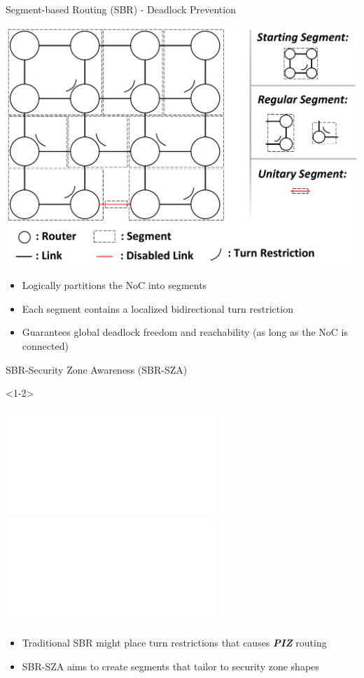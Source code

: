 \begin{frame}[t]{Segment-based Routing (SBR) - Deadlock Prevention}
	\begin{center}
		\includegraphics[width=0.65\linewidth]{images/secure_routing/sbr.pdf}
	\end{center}
	\begin{itemize}
		\item<only@+> Logically partitions the NoC into segments
		
		\item<only@+> Each segment contains a localized bidirectional turn restriction
		
		\item<only@+> Guarantees global deadlock freedom and reachability (as long as the NoC is connected)
	\end{itemize}
\end{frame}

\begin{frame}[t]{SBR-Security Zone Awareness (SBR-SZA)}
	\begin{onlyenv}<1-2>
		\begin{center}
			\includegraphics<1>[width=0.85\linewidth]{images/secure_routing/sbr-configs.pdf}
			\includegraphics<2>[width=0.75\linewidth]{images/secure_routing/sbr-sza.pdf}
		\end{center}
	\end{onlyenv}
	\begin{itemize}
		\item<only@1> Traditional SBR might place turn restrictions that causes \textbf{\textit{PIZ}} routing
		\item<only@2> SBR-SZA aims to create segments that tailor to security zone shapes
	\end{itemize}
\end{frame}

